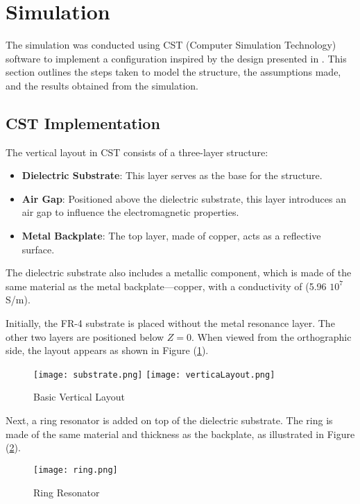 \section{\textsf{Simulation}} 
    The simulation was conducted using CST (Computer Simulation Technology)
    software to implement a configuration inspired by the design presented 
    in \cite{zhang_design_2023}. This section outlines the steps taken to 
    model the structure, the assumptions made, and the results obtained from
    the simulation.

    \subsection{\textsf{CST Implementation}} 
        The vertical layout in CST consists of a three-layer structure:
        \begin{itemize}
        \item \textbf{Dielectric Substrate}:  This layer serves as the 
            base for the structure.
        \item \textbf{Air Gap}: Positioned above the dielectric substrate,
            this layer introduces an air gap to influence the electromagnetic 
            properties.
        \item \textbf{Metal Backplate}: The top layer, made of copper, 
            acts as a reflective surface.
        \end{itemize}

        The dielectric substrate also includes a metallic component, which
        is made of the same material as the metal backplate—copper, with
        a conductivity of (5.96 \mu $10^7$ S/m).

        Initially, the FR-4 substrate is placed without the metal 
        resonance layer. The other two layers are positioned below $Z=0$. 
        When viewed from the orthographic side, the layout appears as shown
        in Figure (\ref{img:layout}).
        \begin{figure}[h]
            \centering
            \texttt{[image: substrate.png]}\hfil
            \texttt{[image: verticaLayout.png]}
            \caption{Basic Vertical Layout}
            \label{img:layout}
        \end{figure}

        Next, a ring resonator is added on top of the dielectric substrate. 
        The ring is made of the same material and thickness as the backplate, 
        as illustrated in Figure (\ref{img:ring}).
        \begin{figure}[h]
            \centering
            \texttt{[image: ring.png]}
            \caption{Ring Resonator}
            \label{img:ring}
        \end{figure}


